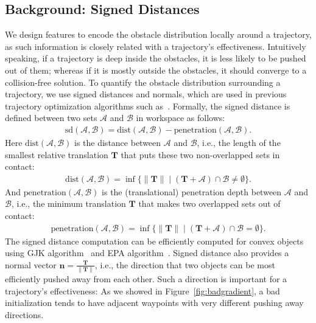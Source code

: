 \documentclass[letterpaper, 10 pt, conference]{ieeeconf}  %
\begin{document}
\subsection{Background: Signed Distances}
We design features to encode the obstacle distribution locally around a trajectory, as such information is closely related with a trajectory's effectiveness. Intuitively speaking, if a trajectory is deep inside the obstacles, it is less likely to be pushed out of them; whereas if it is mostly outside the obstacles, it should converge to a collision-free solution. To quantify the obstacle distribution surrounding a trajectory, we use signed distances and normals, which are used in previous trajectory optimization algorithms such as~\cite{Schulman:2013:FLO}. Formally, the signed distance is defined between two sets $\mathcal A$ and $\mathcal B$ in workspace as follows:
\begin{align}
\text{sd}(\mathcal A, \mathcal B) = \text{dist}(\mathcal A, \mathcal B) - \text{penetration}(\mathcal A, \mathcal B).
\end{align}
Here $\text{dist}(\mathcal A, \mathcal B)$ is the distance between $\mathcal A$ and $\mathcal B$, i.e., the length of the smallest relative translation $\mathbf T$ that puts these two non-overlapped sets in contact:
\begin{align}
\text{dist}(\mathcal A, \mathcal B) = \inf\{\|\mathbf T\| \mid (\mathbf T + \mathcal A) \cap \mathcal B \neq \emptyset\}.
\end{align}
And $\text{penetration}(\mathcal A, \mathcal B)$ is the (translational) penetration depth between $\mathcal A$ and $\mathcal B$, i.e., the minimum translation $\mathbf T$ that makes two overlapped sets out of contact:
\begin{align}
\text{penetration}(\mathcal A, \mathcal B) = \inf\{\|\mathbf T\| \mid (\mathbf T + \mathcal A) \cap \mathcal B = \emptyset\}.
\end{align}
The signed distance computation can be efficiently computed for convex objects using GJK algorithm~\cite{Gilbert:1988:GJK} and EPA algorithm~\cite{Bergen:2001:EPA}. Signed distance also provides a normal vector $\mathbf n = \frac{\mathbf T}{\|\mathbf T\|}$, i.e., the direction that two objects can be most efficiently pushed away from each other. Such a direction is important for a trajectory's effectiveness: As we showed in Figure~\ref{fig:badgradient}, a bad initialization tends to have adjacent waypoints with very different pushing away directions.
\end{document}

